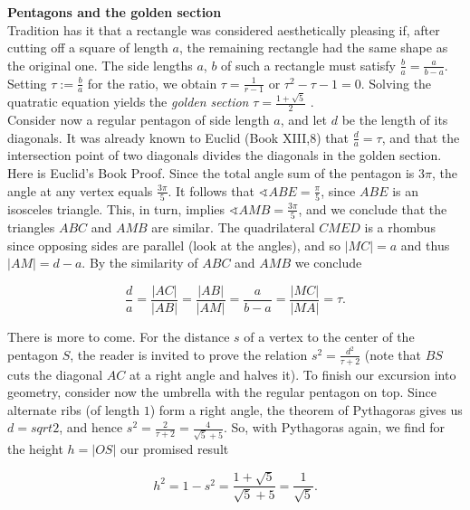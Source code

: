 \documentclass[openany,12pt]{memoir}
\begin{document}
\begin{mdframed}[nobreak=true]
\vspace{8pt}
{\Large\textbf{Pentagons and the golden section}}\\
[5pt]
Tradition has it that a rectangle was considered aesthetically pleasing 
if, after cutting off a square of length $a$, the remaining rectangle had 
the same shape as the original one. The side lengths $a$, $b$  of such a
rectangle must satisfy $\frac{b}{a}= \frac{a}{b-a}$. Setting $\tau := \frac{b}{a}$
for the ratio, we obtain $\tau = \frac{1}{r-1}$ or $\tau^2 - \tau - 1 = 0$. Solving
the quatratic equation yields the \textit{golden section} $\tau = \frac{1 + \sqrt{5}}{2}$ .\\

Consider now a regular pentagon of side length $a$, and let $d$ be the 
length of its diagonals. It was already known to Euclid (Book XIII,8) 
that $\frac{d}{a} = \tau$, and that the intersection point of two diagonals divides 
the diagonals in the golden section.\\

Here is Euclid's Book Proof. Since the total angle sum of the pentagon 
is $3\pi$, the angle at any vertex equals $\frac{3\pi}{5}$. It follows that 
$\sphericalangle ABE = \frac{\pi}{5}$, since $ABE$ is an isosceles triangle. This, in turn, 
implies $\sphericalangle AMB = \frac{3\pi}{5}$, and we conclude that the triangles $ABC$ and 
$AMB$ are similar. The quadrilateral $CMED$  is a rhombus since opposing sides are
parallel (look at the angles), and so $|MC| = a$ and thus $|AM| = d - a$. By the similarity of 
$ABC$ and $AMB$ we conclude

\begin{equation*}
  \frac{d}{a} = \frac{|AC|}{|AB|} = \frac{|AB|}{|AM|} = \frac{a}{b-a} = \frac{|MC|}{|MA|} = \tau.
\end{equation*}

There is more to come. For the distance $s$ of a vertex to the center of 
the pentagon $S$,  the reader is invited to prove the relation $s^2 = \frac{d^2}{\tau + 2}$ 
(note that $BS$ cuts the diagonal $AC$ at a right angle and halves it). 
To finish our excursion into geometry, consider now the umbrella 
with the regular pentagon on top. Since alternate ribs (of length $1$) 
form a right angle, the theorem of Pythagoras gives us $d = sqrt{2}$, and 
hence $s^2 = \frac{2}{\tau + 2} = \frac{4}{\sqrt{5} + 5}$. So, with Pythagoras again, 
we find for the height $h = |OS|$ our promised result

\begin{equation*}
  h^2 = 1 - s^2 = \frac{1+\sqrt{5}}{\sqrt{5}+5} = \frac{1}{\sqrt{5}}.
\end{equation*}

\vspace{5pt}

\end{mdframed}
\end{document}
